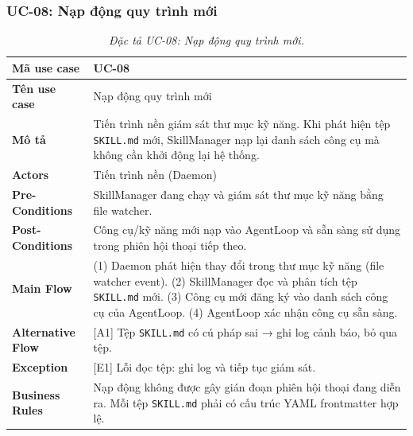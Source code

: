 \subsubsection{UC-08: Nạp động quy trình mới}
\label{subsec:spec-uc08}
\renewcommand{\arraystretch}{1.4}
\begin{longtable}{|>{\bfseries}p{3.5cm}|p{10.5cm}|}
  \caption{\emph{Đặc tả UC-08: Nạp động quy trình mới.}} \label{tab:spec-uc08} \\
  \hline
  Mã use case      & UC-08 \\ \hline
  Tên use case     & Nạp động quy trình mới \\ \hline
  Mô tả            & Tiến trình nền giám sát thư mục kỹ năng. Khi phát hiện tệp \texttt{SKILL.md} mới, SkillManager nạp lại danh sách công cụ mà không cần khởi động lại hệ thống. \\ \hline
  Actors           & Tiến trình nền (Daemon) \\ \hline
  Pre-Conditions   & SkillManager đang chạy và giám sát thư mục kỹ năng bằng file watcher. \\ \hline
  Post-Conditions  & Công cụ/kỹ năng mới nạp vào AgentLoop và sẵn sàng sử dụng trong phiên hội thoại tiếp theo. \\ \hline
  Main Flow        & (1) Daemon phát hiện thay đổi trong thư mục kỹ năng (file watcher event).\newline
                     (2) SkillManager đọc và phân tích tệp \texttt{SKILL.md} mới.\newline
                     (3) Công cụ mới đăng ký vào danh sách công cụ của AgentLoop.\newline
                     (4) AgentLoop xác nhận công cụ sẵn sàng. \\ \hline
  Alternative Flow & [A1] Tệp \texttt{SKILL.md} có cú pháp sai → ghi log cảnh báo, bỏ qua tệp. \\ \hline
  Exception        & [E1] Lỗi đọc tệp: ghi log và tiếp tục giám sát. \\ \hline
  Business Rules   & Nạp động không được gây gián đoạn phiên hội thoại đang diễn ra.\newline
                     Mỗi tệp \texttt{SKILL.md} phải có cấu trúc YAML frontmatter hợp lệ. \\ \hline
\end{longtable}

